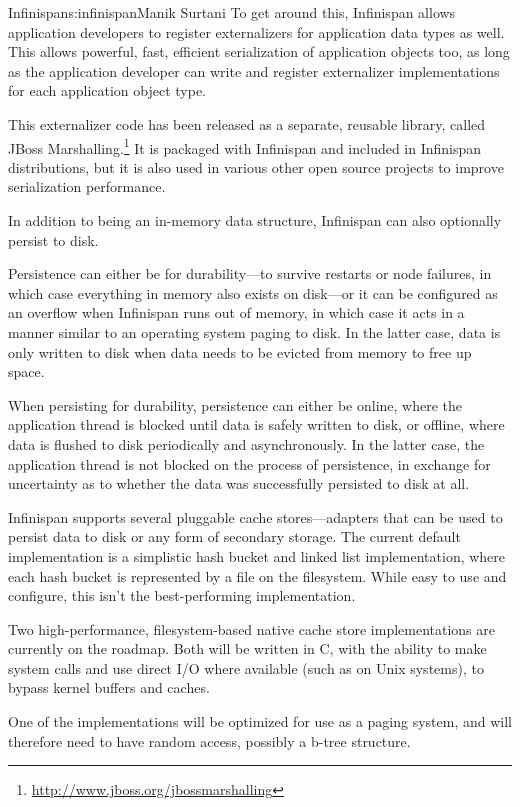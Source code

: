 \begin{aosachapter}{Infinispan}{s:infinispan}{Manik Surtani}
To get around this, Infinispan allows application developers to register
externalizers for application data types as well. This allows powerful,
fast, efficient serialization of application objects too, as long as the
application developer can write and register externalizer
implementations for each application object type.

This externalizer code has been released as a separate, reusable
library, called JBoss Marshalling.\footnote{\url{http://www.jboss.org/jbossmarshalling}}
It is packaged with Infinispan and included in Infinispan
distributions, but it is also used in various other open source
projects to improve serialization performance.


In addition to being an in-memory data structure, Infinispan can also
optionally persist to disk.

Persistence can either be for durability---to survive restarts or node
failures, in which case everything in memory also exists on disk---or it
can be configured as an overflow when Infinispan runs out of memory, in
which case it acts in a manner similar to an operating system paging to
disk. In the latter case, data is only written to disk when data needs
to be evicted from memory to free up space.

When persisting for durability, persistence can either be online, where
the application thread is blocked until data is safely written to disk,
or offline, where data is flushed to disk periodically and
asynchronously. In the latter case, the application thread is not
blocked on the process of persistence, in exchange for uncertainty as to
whether the data was successfully persisted to disk at all.

Infinispan supports several pluggable cache stores---adapters that can
be used to persist data to disk or any form of secondary storage. The
current default implementation is a simplistic hash bucket and linked
list implementation, where each hash bucket is represented by a file on
the filesystem. While easy to use and configure, this isn't the
best-performing implementation.

Two high-performance, filesystem-based native cache store
implementations are currently on the roadmap. Both will be written in C,
with the ability to make system calls and use direct I/O where available
(such as on Unix systems), to bypass kernel buffers and caches. 

One of the implementations will be optimized for use as a paging system,
and will therefore need to have random access, possibly a b-tree
structure.


\end{aosachapter}
